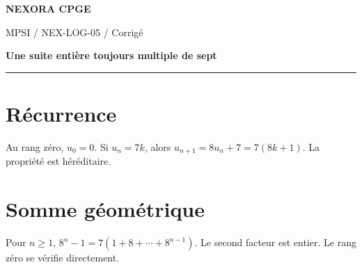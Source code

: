 \documentclass[11pt,a4paper]{article}
\begin{document}
{\small\bfseries\color{nexorablue} NEXORA CPGE}\par
{\small MPSI / NEX-LOG-05 / Corrigé}\par
{\LARGE\bfseries Une suite entière toujours multiple de sept}\par
\vspace{0.25em}\hrule\vspace{0.6em}

\section*{Récurrence}
Au rang zéro, $u_0=0$. Si $u_n=7k$, alors $u_{n+1}=8u_n+7=7(8k+1)$. La propriété est héréditaire.

\section*{Somme géométrique}
Pour $n\ge1$, $8^n-1=7(1+8+\cdots+8^{n-1})$. Le second facteur est entier. Le rang zéro se vérifie directement.
\end{document}
